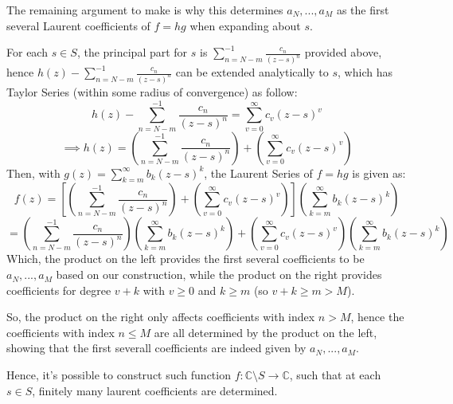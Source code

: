 \documentclass{article}
\begin{document}
\hfil

The remaining argument to make is why this determines $a_N,...,a_M$ as the first several Laurent coefficients of $f=hg$ when expanding about $s$.

For each $s\in S$, the principal part for $s$ is $\sum_{n=N-m}^{-1}\frac{c_n}{(z-s)^n}$ provided above, hence $h(z)-\sum_{n=N-m}^{-1}\frac{c_n}{(z-s)^n}$ can be extended analytically to $s$, which has Taylor Series (within some radius of convergence) as follow:
$$h(z)-\sum_{n=N-m}^{-1}\frac{c_n}{(z-s)^n}=\sum_{v=0}^{\infty}c_v(z-s)^v$$
$$\implies h(z)=\left(\sum_{n=N-m}^{-1}\frac{c_n}{(z-s)^n}\right)+\left(\sum_{v=0}^{\infty}c_v(z-s)^v\right)$$
Then, with $g(z)=\sum_{k=m}^{\infty}b_k(z-s)^k$, the Laurent Series of $f=hg$ is given as:
$$f(z)=\left[\left(\sum_{n=N-m}^{-1}\frac{c_n}{(z-s)^n}\right)+\left(\sum_{v=0}^{\infty}c_v(z-s)^v\right)\right]\left(\sum_{k=m}^{\infty}b_k(z-s)^k\right)$$
$$=\left(\sum_{n=N-m}^{-1}\frac{c_n}{(z-s)^n}\right)\left(\sum_{k=m}^{\infty}b_k(z-s)^k\right)+\left(\sum_{v=0}^{\infty}c_v(z-s)^v\right)\left(\sum_{k=m}^{\infty}b_k(z-s)^k\right)$$
Which, the product on the left provides the first several coefficients to be $a_N,...,a_M$ based on our construction,
while the product on the right provides coefficients for degree $v+k$ with $v\geq 0$ and $k\geq m$ (so $v+k\geq m>M$).

So, the product on the right only affects coefficients with index $n>M$, hence the coefficients with index $n\leq M$ are all determined by the product on the left, showing that the first severall coefficients are indeed given by $a_N,...,a_M$.

Hence, it's possible to construct such function $f:\mathbb{C}\setminus S\rightarrow \mathbb{C}$, such that at each $s\in S$, finitely many laurent coefficients are determined.

\break
\end{document}
